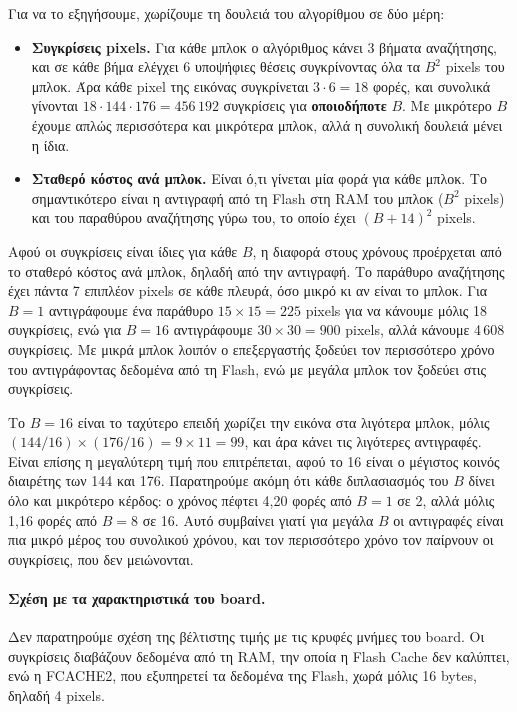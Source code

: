 \documentclass[12pt]{article}
\begin{document}
Για να το εξηγήσουμε, χωρίζουμε τη δουλειά του αλγορίθμου σε δύο μέρη:
\begin{itemize}
    \item \textbf{Συγκρίσεις pixels.} Για κάθε μπλοκ ο αλγόριθμος κάνει 3 βήματα αναζήτησης, και σε κάθε βήμα ελέγχει 6 υποψήφιες θέσεις συγκρίνοντας όλα τα $B^2$ pixels του μπλοκ. Άρα κάθε pixel της εικόνας συγκρίνεται $3 \cdot 6 = 18$ φορές, και συνολικά γίνονται $18 \cdot 144 \cdot 176 = 456\,192$ συγκρίσεις για \textbf{οποιοδήποτε} $B$. Με μικρότερο $B$ έχουμε απλώς περισσότερα και μικρότερα μπλοκ, αλλά η συνολική δουλειά μένει η ίδια.

    \item \textbf{Σταθερό κόστος ανά μπλοκ.} Είναι ό,τι γίνεται μία φορά για κάθε μπλοκ. Το σημαντικότερο είναι η αντιγραφή από τη Flash στη RAM του μπλοκ ($B^2$ pixels) και του παραθύρου αναζήτησης γύρω του, το οποίο έχει $(B+14)^2$ pixels.
\end{itemize}

Αφού οι συγκρίσεις είναι ίδιες για κάθε $B$, η διαφορά στους χρόνους προέρχεται από το σταθερό κόστος ανά μπλοκ, δηλαδή από την αντιγραφή. Το παράθυρο αναζήτησης έχει πάντα 7 επιπλέον pixels σε κάθε πλευρά, όσο μικρό κι αν είναι το μπλοκ. Για $B = 1$ αντιγράφουμε ένα παράθυρο $15 \times 15 = 225$ pixels για να κάνουμε μόλις 18 συγκρίσεις, ενώ για $B = 16$ αντιγράφουμε $30 \times 30 = 900$ pixels, αλλά κάνουμε 4\,608 συγκρίσεις. Με μικρά μπλοκ λοιπόν ο επεξεργαστής ξοδεύει τον περισσότερο χρόνο του αντιγράφοντας δεδομένα από τη Flash, ενώ με μεγάλα μπλοκ τον ξοδεύει στις συγκρίσεις.

Το $B = 16$ είναι το ταχύτερο επειδή χωρίζει την εικόνα στα λιγότερα μπλοκ, μόλις $(144/16) \times (176/16) = 9 \times 11 = 99$, και άρα κάνει τις λιγότερες αντιγραφές. Είναι επίσης η μεγαλύτερη τιμή που επιτρέπεται, αφού το 16 είναι ο μέγιστος κοινός διαιρέτης των 144 και 176. Παρατηρούμε ακόμη ότι κάθε διπλασιασμός του $B$ δίνει όλο και μικρότερο κέρδος: ο χρόνος πέφτει 4,20 φορές από $B = 1$ σε 2, αλλά μόλις 1,16 φορές από $B = 8$ σε 16. Αυτό συμβαίνει γιατί για μεγάλα $B$ οι αντιγραφές είναι πια μικρό μέρος του συνολικού χρόνου, και τον περισσότερο χρόνο τον παίρνουν οι συγκρίσεις, που δεν μειώνονται.

\paragraph{Σχέση με τα χαρακτηριστικά του board.}
Δεν παρατηρούμε σχέση της βέλτιστης τιμής με τις κρυφές μνήμες του board. Οι συγκρίσεις διαβάζουν δεδομένα από τη RAM, την οποία η Flash Cache δεν καλύπτει, ενώ η FCACHE2, που εξυπηρετεί τα δεδομένα της Flash, χωρά μόλις 16 bytes, δηλαδή 4 pixels. 
\end{document}
